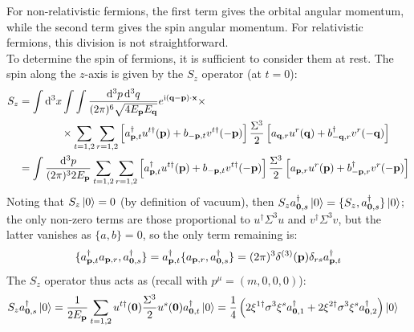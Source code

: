 For non-relativistic fermions, the first term gives the orbital angular momentum, while the second term gives the spin angular momentum. For relativistic fermions, this division is not straightforward.\\
To determine the spin of fermions, it is sufficient to consider them at rest. The spin along the $ z $-axis is given by the $ S_z $ operator (at $ t = 0 $):
\begin{equation*}
  \begin{split}
    S_z
    &= \int \mathrm{d}^3x \int \int \frac{\mathrm{d}^3p\, \mathrm{d}^3q}{(2\pi)^6 \sqrt{4 E_{\mathbf{p}} E_{\mathbf{q}}}} e^{\mathrm{i} (\mathbf{q} - \mathbf{p}) \cdot \mathbf{x}} \times \\
    & \qquad \qquad \times \sum_{t = 1,2} \sum_{r = 1,2} \left[ a_{\mathbf{p},t}^\dagger u^{t\dagger}(\mathbf{p}) + b_{-\mathbf{p},t} v^{t\dagger}(-\mathbf{p}) \right] \frac{\Sigma^3}{2} \left[ a_{\mathbf{q},r} u^r(\mathbf{q}) + b_{-\mathbf{q},r}^\dagger v^r(-\mathbf{q}) \right] \\
    &= \int \frac{\mathrm{d}^3p}{(2\pi)^3 2E_{\mathbf{p}}} \sum_{t = 1,2} \sum_{r = 1,2} \left[ a_{\mathbf{p},t}^\dagger u^{t\dagger}(\mathbf{p}) + b_{-\mathbf{p},t} v^{t\dagger}(-\mathbf{p}) \right] \frac{\Sigma^3}{2} \left[ a_{\mathbf{p},r} u^r(\mathbf{p}) + b_{-\mathbf{p},r}^\dagger v^r(-\mathbf{p}) \right] \\
  \end{split}
\end{equation*}
Noting that $ S_z \ket{0} = 0 $ (by definition of vacuum), then $ S_z a_{\mathbf{0},s}^\dagger \ket{0} = \{S_z , a_{\mathbf{0},s}^\dagger\} \ket{0} $; the only non-zero terms are those proportional to $ u^\dagger \Sigma^3 u $ and $ v^\dagger \Sigma^3 v $, but the latter vanishes as $ \{a,b\} = 0 $, so the only term remaining is:
\begin{equation*}
  \{a_{\mathbf{p},t}^\dagger a_{\mathbf{p},r} , a_{\mathbf{0},s}^\dagger\} = a_{\mathbf{p},t}^\dagger \{a_{\mathbf{p},r} , a_{\mathbf{0},s}^\dagger\} = (2\pi)^3 \delta^{(3)}(\mathbf{p}) \delta_{rs} a_{\mathbf{p},t}^\dagger
\end{equation*}
The $ S_z $ operator thus acts as (recall  with $ p^\mu = (m,0,0,0) $):
\begin{equation*}
  \begin{split}
    S_z a_{\mathbf{0},s}^\dagger \ket{0}
    &= \frac{1}{2E_{\mathbf{p}}} \sum_{t = 1,2} u^{t\dagger}(\mathbf{0}) \frac{\Sigma^3}{2} u^s(\mathbf{0}) a_{\mathbf{0},t}^\dagger \ket{0} = \frac{1}{4} \left( 2\xi^{1\dagger} \sigma^3 \xi^s a_{\mathbf{0},1}^\dagger + 2\xi^{2\dagger} \sigma^3 \xi^s a_{\mathbf{0},2}^\dagger \right) \ket{0}
  \end{split}
\end{equation*}
